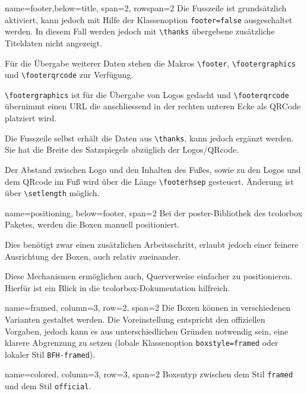 \documentclass[
	paper=a0,%
	style=ruled, %
	]{bfhsciposter}
\newcommand{\tbs}{\textbackslash}
\let\code\texttt
\newcommand*{\macro}[1]{\code{\tbs#1}}
\let\pck\textsf
\begin{document}
\begin{tcbposter}[
	poster={
		columns=4,
		rows=7,
		spacing=1cm,
	},]
\begin{posterboxenv}[title=Fusszeile]{name=footer,below=title, span=2, rowspan=2 }
	Die Fusszeile ist grundsätzlich aktiviert, kann jedoch mit Hilfe der Klassenoption \code{footer=false} ausgeschaltet werden. In diesem Fall werden jedoch mit \macro{thanks} übergebene zusätzliche Titeldaten nicht angezeigt.

	Für die Übergabe weiterer Daten stehen die Makros \macro{footer}, \macro{footergraphics} und \macro{footerqrcode} zur Verfügung.

	\macro{footergraphics} ist für die Übergabe von Logos gedacht und \macro{footerqrcode} übernimmt einen URL die anschliessend in der rechten unteren Ecke als QRCode platziert wird.

	Die Fusszeile selbst erhält die Daten aus \macro{thanks}, kann jedoch ergänzt werden. Sie hat die Breite des Satzspiegels abzüglich der Logos/QRcode.

	Der Abstand zwischen Logo und den Inhalten des Fußes, sowie zu den Logos und dem QRcode im Fuß wird über die Länge \macro{footerhsep} gesteuert. Änderung ist über \macro{setlength} möglich.
\end{posterboxenv}

\begin{posterboxenv}[title=Platzierung der Boxen]{name=positioning, below=footer, span=2}
	Bei der \pck{poster}-Bibliothek des \pck{tcolorbox} Paketes, werden die Boxen manuell positioniert.

	Dies benötigt zwar einen zusätzlichen Arbeitsschritt, erlaubt jedoch einer feinere Ausrichtung der Boxen, auch relativ zueinander.

	Diese Mechanismen ermöglichen auch, Querverweise einfacher zu positionieren. Hierfür ist ein Blick in die \pck{tcolorbox}-Dokumentation hilfreich.
\end{posterboxenv}

\begin{posterboxenv}[title=Eine Box im Stil BFH-framed, BFH-framed]{name=framed, column=3, row=2, span=2}
	Die Boxen können in verschiedenen Varianten gestaltet werden. Die Voreinstellung entspricht den offiziellen Vorgaben, jedoch kann es aus unterschiedlichen Gründen notwendig sein, eine klarere Abgrenzung zu setzen (lobale Klassenoption \code{boxstyle=framed} oder lokaler Stil \code{BFH-framed}).
\end{posterboxenv}

\begin{posterboxenv}[title=Eine Box im Stil BFH-colored, BFH-colored]{name=colored, column=3, row=3, span=2}
	Boxentyp zwischen dem Stil \code{framed} und dem Stil \code{official}.


\end{posterboxenv}
\end{tcbposter}
\end{document}

